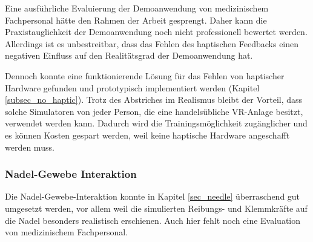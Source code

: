 
Eine ausführliche Evaluierung der Demoanwendung von medizinischem Fachpersonal hätte den Rahmen der Arbeit gesprengt. Daher kann die Praxistauglichkeit der Demoanwendung noch nicht professionell bewertet werden.
Allerdings ist es unbestreitbar, dass das Fehlen des haptischen Feedbacks einen negativen Einfluss auf den Realitätsgrad der Demoanwendung hat.

Dennoch konnte eine funktionierende Lösung für das Fehlen von haptischer Hardware gefunden und prototypisch implementiert werden (Kapitel \ref{subsec_no_haptic}). %
Trotz des Abstriches im Realismus bleibt der Vorteil, dass solche Simulatoren von jeder Person, die eine handelsübliche VR-Anlage besitzt, verwendet werden kann. Dadurch wird die Trainingsmöglichkeit zugänglicher und es können Kosten gespart werden, weil keine haptische Hardware angeschafft werden muss.


\subsubsection{Nadel-Gewebe Interaktion}
Die Nadel-Gewebe-Interaktion konnte in Kapitel \ref{sec_needle} überraschend gut umgesetzt werden, vor allem weil die simulierten Reibungs- und Klemmkräfte auf die Nadel besonders realistisch erschienen. Auch hier fehlt noch eine Evaluation von medizinischem Fachpersonal.


